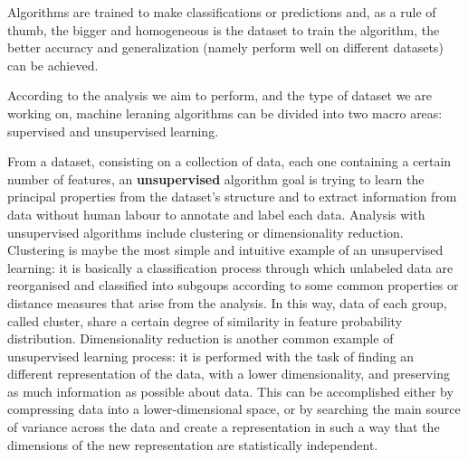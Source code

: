\documentclass[11pt]{report}
\begin{document}
Algorithms are trained to make classifications or predictions and, as a rule of thumb, the bigger and homogeneous is the dataset to train the algorithm, the better accuracy and generalization (namely perform well on different datasets) can be achieved.

According to the analysis we aim to perform, and the type of dataset we are working on, machine leraning algorithms can be divided into two macro areas: supervised and unsupervised learning.

From a dataset, consisting on a collection of data, each one containing a certain number of features, an \textbf{unsupervised} algorithm goal is trying to learn the principal properties from the dataset's structure and to extract information from data without human labour to annotate and label each data.
Analysis with unsupervised algorithms include clustering or dimensionality reduction.
Clustering is maybe the most simple and intuitive example of an unsupervised learning: it is basically a classification process through which unlabeled data are reorganised and classified into subgoups according to some common properties or distance measures that arise from the analysis.
In this way, data of each group, called cluster, share a certain degree of similarity in feature probability distribution.
Dimensionality reduction is another common example of unsupervised learning process: it is performed with the task of finding an different representation of the data, with a lower dimensionality, and preserving as much information as possible about data.
This can be accomplished either by compressing data into a lower-dimensional space, or by searching the main source of variance across the data and create a representation in such a way that the dimensions of the new representation are statistically independent.



\end{document}
